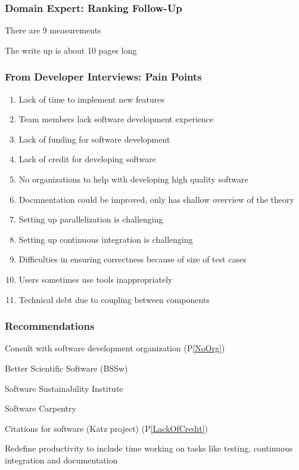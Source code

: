 \documentclass[t,12pt,numbers,fleqn]{beamer}
\begin{document}

\begin{frame}
\frametitle{Domain Expert: Ranking Follow-Up}

\bi
\item {}
\bi
\item There are 9 measurements
\item The write up is about 10 pages long \ei \ei

\end{frame}


\begin{frame}
\frametitle{From Developer Interviews: Pain Points}

\begin{enumerate}
\item Lack of time to implement new features \label{LackOfTime}
\item Team members lack software development experience
\item Lack of funding for software development
\item Lack of credit for developing software \label{LackOfCredit}
\item No organizations to help with developing high quality software \label{NoOrg}
\item Documentation could be improved, only has shallow overview of the theory
\item Setting up parallelization is challenging
\item Setting up continuous integration is challenging
\item Difficulties in ensuring correctness because of size of test cases
\item Users sometimes use tools inappropriately
\item Technical debt due to coupling between components
\end{enumerate}

\end{frame}


\begin{frame}
\frametitle{Recommendations}

\bi
\item Consult with software development organization (P\ref{NoOrg})
  \bi
\item Better Scientific Software (BSSw)
\item Software Sustainability Institute
\item Software Carpentry
  \ei
\item Citations for software (Katz project) (P\ref{LackOfCredit})
  \item Redefine productivity to include time working on tasks like testing, continuous
    integration and documentation
\ei

\end{frame}
\end{document}
